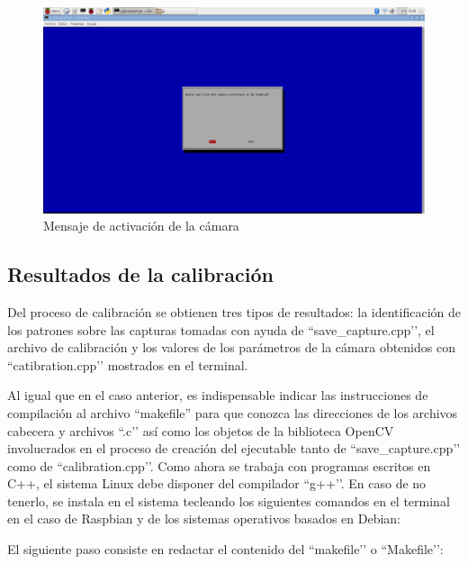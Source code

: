     \begin{figure}[H]
    \centering
    \includegraphics[scale = 0.25]{capitulo_04/figuras_dir/actp3.jpg}
    \caption{Mensaje de activación de la cámara}
    \label{fig: mensaje}
    \end{figure}


\subsection{Resultados de la calibración} \label{s4_2_3}

Del proceso de calibración se obtienen tres tipos de resultados: la identificación de los patrones sobre las capturas tomadas con ayuda de ``save\_capture.cpp’’, el archivo de calibración y los valores de los parámetros de la cámara obtenidos con ``catibration.cpp’’ mostrados en el terminal.

Al igual que en el caso anterior, es indispensable indicar las instrucciones de compilación al archivo ``makefile'' para que conozca las direcciones de los archivos cabecera y archivos ``.c’’ así como los objetos de la biblioteca OpenCV involucrados en el proceso de creación del ejecutable tanto de ``save\_capture.cpp’’ como de ``calibration.cpp’’. Como ahora se trabaja con programas escritos en C++, el sistema Linux debe disponer del compilador ``g++’’. En caso de no tenerlo, se instala en el sistema tecleando los siguientes comandos en el terminal en el caso de Raspbian y de los sistemas operativos basados en Debian:


El siguiente paso consiste en redactar el contenido del ``makefile’’ o ``Makefile’’:

